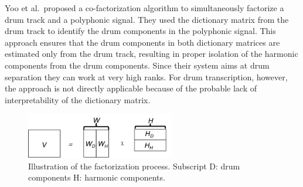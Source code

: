 \documentclass[a4paper]{article}
\begin{document}
Yoo et al.\ proposed a co-factorization algorithm \cite{yoo_nonnegative_2010} to simultaneously factorize a drum track and a polyphonic signal. They used the dictionary matrix from the drum track to identify the drum components in the polyphonic signal. This approach ensures that the drum components in both dictionary matrices are estimated only from the drum track, resulting in proper isolation of the harmonic components from the drum components. Since their system aims at drum separation they can work at very high ranks. For drum transcription, however, the approach is not directly applicable because of the probable lack of interpretability of the dictionary matrix.
\begin{figure}
 \centering 
  \centerline{
 \includegraphics[width=6.5cm]{factorization_small.png}}
 \caption{Illustration of the factorization process. Subscript $\mathrm{D}$: drum components $\mathrm{H}$: harmonic components.}
 \label{fig:factorization}
\end{figure}
\end{document}

